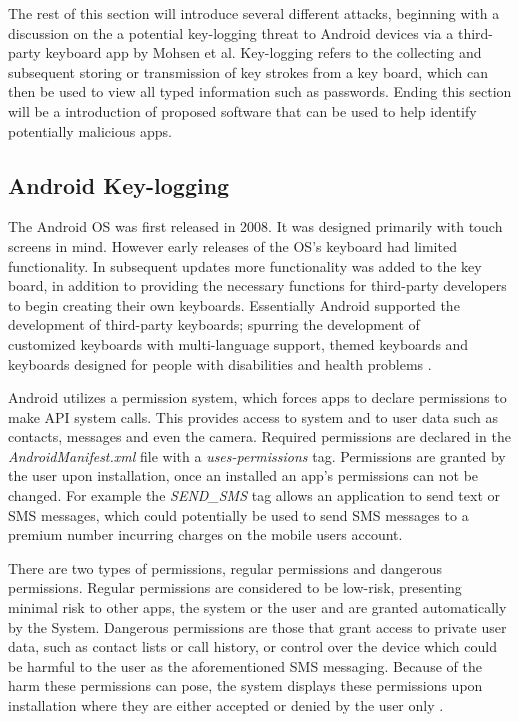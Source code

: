 \documentclass{sig-alternate}
\begin{document}
 
  The rest of this section will introduce several different attacks,  beginning with a discussion on the a potential key-logging threat to Android devices via a third-party keyboard app by Mohsen et al. Key-logging refers to the collecting and subsequent storing or transmission of key strokes from a key board, which can then be used to view all typed information such as passwords. Ending this section will be a introduction of proposed software that can be used to help identify potentially malicious apps. 
  
	\subsection{Android Key-logging}
	\label{app}        
	The Android OS was first released in 2008. It was designed primarily with touch screens in mind. However early releases of the OS's keyboard had limited functionality. In subsequent updates more functionality was added to the key board, in addition to providing the necessary functions for third-party developers to begin creating their own keyboards. Essentially Android supported the development of third-party keyboards; spurring the development of\\ customized keyboards with multi-language support, themed keyboards and keyboards designed for people with disabilities and health problems \cite{Keylogging}.
	
	Android utilizes a permission system, which forces apps to declare permissions to make API system calls. This provides access to system and to user data such as contacts, messages and even the camera. Required permissions are declared in the \textit{AndroidManifest.xml} file with a \textit{uses-permissions} tag. Permissions are granted by the user upon installation, once an installed an app's permissions can not be changed. For example the \textit{SEND\_SMS} tag allows an application to send text or SMS messages, which could potentially be used to send SMS messages to a premium number incurring charges on the mobile users account.
	
	 There are two types of permissions, regular permissions and dangerous permissions. Regular permissions are considered to be low-risk, presenting minimal risk to other apps, the system or the user and are granted automatically by the System. Dangerous permissions are those that grant access to private user data, such as contact lists or call history, or control over the device which could be harmful to the user as the aforementioned SMS messaging. Because of the harm these permissions can pose, the system displays these permissions upon installation where they are either accepted or denied by the user only \cite{Keylogging}.
	 
\end{document}
